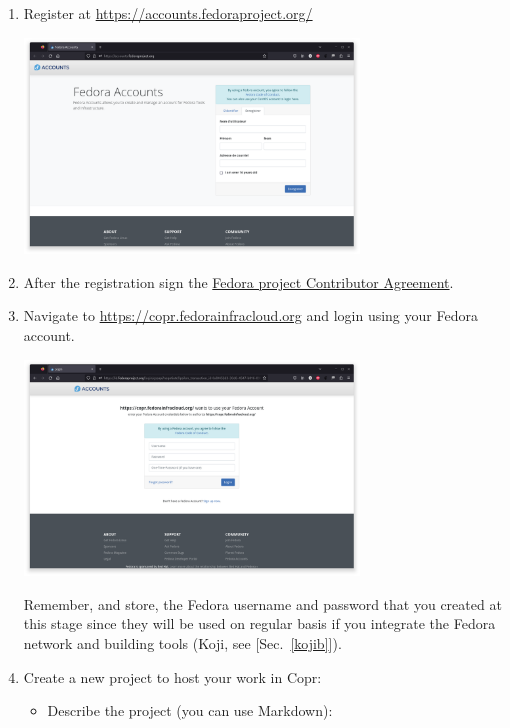 \begin{enumerate}
\item Register at \href{https://accounts.fedoraproject.org/}{https://accounts.fedoraproject.org/}
\begin{center}
\includegraphics[width=0.7\textwidth,keepaspectratio=true,draft=\ddst]{img/rpms/f-account.eps}
\end{center}
\item After the registration sign the \href{https://docs.fedoraproject.org/en-US/legal/fpca/}{Fedora project Contributor Agreement}. 
\item Navigate to \href{https://copr.fedorainfracloud.org}{https://copr.fedorainfracloud.org} and login using your Fedora account. 
\begin{center}
\includegraphics[width=0.7\textwidth,keepaspectratio=true,draft=\ddst]{img/rpms/c-login.eps}
\end{center}
Remember, and store, the Fedora username and password that you created at this stage since they will be used on regular basis if you integrate the Fedora network and building tools (Koji, see [Sec.~\ref{kojib}]). 
\newpage
\item Create a new project to host your work in Copr: 
\begin{itemize}
\item Describe the project (you can use Markdown):
\begin{center}

\end{center}
\end{itemize}
\end{enumerate}
